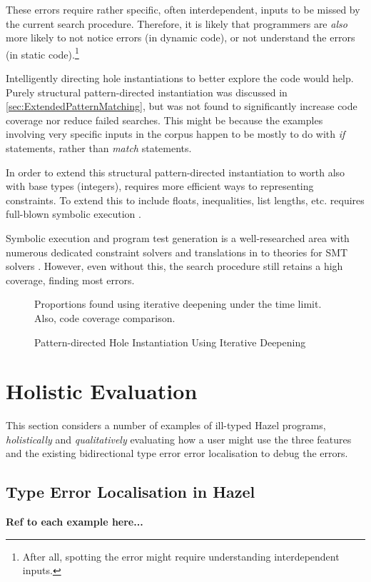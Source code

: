 These errors require rather specific, often interdependent, inputs to be missed by the current search procedure. Therefore, it is likely that programmers are \textit{also} more likely to not notice errors (in dynamic code), or not understand the errors (in static code).\footnote{After all, spotting the error might require understanding interdependent inputs.}

Intelligently directing hole instantiations to better explore the code would help. Purely structural pattern-directed instantiation was discussed in \cref{sec:ExtendedPatternMatching}, but was not found to significantly increase code coverage nor reduce failed searches. This might be because the examples involving very specific inputs in the corpus happen to be mostly to do with \textit{if} statements, rather than \textit{match} statements.

In order to extend this structural pattern-directed instantiation to worth also with base types (integers), requires more efficient ways to representing constraints. To extend this to include floats, inequalities, list lengths, etc. requires full-blown symbolic execution \cite{SymbolicExecutionSurvey}. 

Symbolic execution and program test generation is a well-researched area with numerous dedicated constraint solvers \cite{CITE MANY HERE} and translations in to theories for SMT solvers \cite{CITE SMTS HERE}. However, even without this, the search procedure still retains a high coverage, finding most errors.

\begin{figure}\centering
Proportions found using iterative deepening under the time limit. Also, code coverage comparison.
\caption{Pattern-directed Hole Instantiation Using Iterative Deepening}
\end{figure}

\section{Holistic Evaluation}
\label{sec:HolisticEvaluation}

This section considers a number of examples of ill-typed Hazel programs, \textit{holistically} and \textit{qualitatively} evaluating how a user might use the three features and the existing bidirectional type error error localisation \cite{HazelErrors} to debug the errors. 


\subsection{Type Error Localisation in Hazel}
\textbf{Ref to each example here...}

